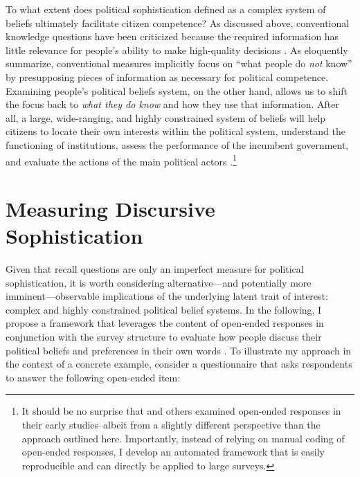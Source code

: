 To what extent does political sophistication defined as a complex system of beliefs ultimately facilitate citizen competence? As discussed above, conventional knowledge questions have been criticized because the required information has little relevance for people's ability to make high-quality decisions \citep{lupia2006elitism}. As \citeauthor{cramer2017fact} eloquently summarize, conventional measures implicitly focus on ``what people do \textit{not} know'' \citeyearpar[756, emphasis added]{cramer2017fact} by presupposing pieces of information as necessary for political competence. Examining people's political beliefs system, on the other hand, allows us to shift the focus back to \textit{what they do know} and how they use that information. After all, a large, wide-ranging, and highly constrained system of beliefs will help citizens to locate their own interests within the political system, understand the functioning of institutions, assess the performance of the incumbent government, and evaluate the actions of the main political actors \citep[e.g.,][]{converse1964nature}.\footnote{It should be no surprise that \citet{converse1964nature} and others examined open-ended responses in their early studies--albeit from a slightly different perspective than the approach outlined here. Importantly, instead of relying on manual coding of open-ended responses, I develop an automated framework that is easily reproducible and can directly be applied to large surveys.}



\section*{Measuring Discursive Sophistication}


Given that recall questions are only an imperfect measure for political sophistication, it is worth considering alternative---and potentially more imminent---observable implications of the underlying latent trait of interest: complex and highly constrained political belief systems. In the following, I propose a framework that leverages the content of open-ended responses in conjunction with the survey structure to evaluate how people discuss their political beliefs and preferences in their own words \citep[see also][for a related analysis of moral reasoning in open-ended responses]{kraft2018measuring}. To illustrate my approach in the context of a concrete example, consider a questionnaire that asks respondents to answer the following open-ended item:

